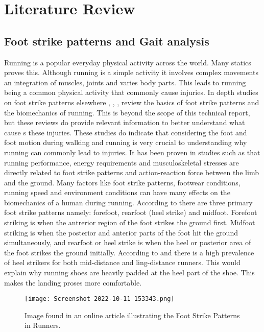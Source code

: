 \graphicspath{{litreview/fig/}}

\chapter{Literature Review}
\label{chap:litreview}
\section{Foot strike patterns and Gait analysis}
\label{sec:Gait}
Running is a popular everyday physical activity across the world. Many statics proves this\cite{statistaresearchdepartment2020}. Although running is a simple activity it involves complex movements an integration of muscles, joints and varies body parts. This leads to running being a common physical activity that commonly cause injuries. In depth studies on foot strike patterns elsewhere \cite{doi:10.2519/jospt.2015.6019}, \cite{CAVANAGH1980397
}, \cite{matheuso.almeidaptphdirenes.davisptphdalexandred.lopesptphd2015}, \cite{lauram.andersondanielr.bonannoharvif.hart&christianj.barton2020} review the basics of foot strike patterns and the biomechanics of running. This is beyond the scope of this technical report, but these reviews do provide relevant information to better understand what cause s these injuries. These studies do indicate that considering the foot and foot motion during walking and running is very crucial to understanding why running can commonly lead to injuries. It has been proven in studies such as \cite{kennethp.clarklaurencej.ryanpeterg.weyand2014} that running performance, energy requirements and musculoskeletal stresses are directly related to foot strike patterns and action-reaction force between the limb and the ground. Many factors like foot strike patterns, footwear conditions, running speed and environment conditions can have many effects on the biomechanics of a human during running. According to \cite{matheuso.almeidaptphdirenes.davisptphdalexandred.lopesptphd2015} there are three primary foot strike patterns namely: forefoot, rearfoot (heel strike) and midfoot. Forefoot  striking is when the antrerior region of the foot strikes the ground first. Midfoot striking is when the posterior and anterior parts of the foot hit the ground simultaneously, and rearfoot or heel strike is when the heel or posterior area of the foot strikes the ground initially. According to \cite{marEfootstrike} and \cite{matheuso.almeidaptphdirenes.davisptphdalexandred.lopesptphd2015} there is a high prevalence of heel strikers for both mid-distance and ling-distance runners. This would explain why running shoes are heavily padded at the heel part of the shoe. This makes the landing proses more comfortable.
\begin{figure}[!htb]
    \centering
    \texttt{[image: Screenshot 2022-10-11 153343.png]}
    \caption{Image found in an online article\cite{mass4d2017} illustrating the Foot Strike Patterns in Runners.}
    \label{fig:footstrike}
\end{figure}



